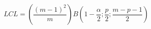 

\[
LCL = \left( \frac{(m - 1)^2}{m} \right)
B \left( 1 - \frac{\alpha}{2}; \frac{p}{2}; \frac{m - p -1}{2} \right)
\]


